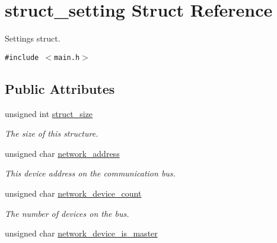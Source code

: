 \hypertarget{structstruct__setting}{
\section{struct\_\-setting Struct Reference}
\label{structstruct__setting}
}
Settings struct.  


{\tt \#include $<$main.h$>$}

\subsection*{Public Attributes}
\begin{CompactItemize}
\item 
\hypertarget{structstruct__setting_f04e2d9d3ccc998c560c2907505be6ca}{
unsigned int \hyperlink{structstruct__setting_f04e2d9d3ccc998c560c2907505be6ca}{struct\_\-size}}
\label{structstruct__setting_f04e2d9d3ccc998c560c2907505be6ca}

\begin{CompactList}\small\item\em The size of this structure. \item\end{CompactList}\item 
\hypertarget{structstruct__setting_d31da2957970eb0e3d4b8b29220f4312}{
unsigned char \hyperlink{structstruct__setting_d31da2957970eb0e3d4b8b29220f4312}{network\_\-address}}
\label{structstruct__setting_d31da2957970eb0e3d4b8b29220f4312}

\begin{CompactList}\small\item\em This device address on the communication bus. \item\end{CompactList}\item 
\hypertarget{structstruct__setting_b1788192fdd675e45577525f4a66f6ed}{
unsigned char \hyperlink{structstruct__setting_b1788192fdd675e45577525f4a66f6ed}{network\_\-device\_\-count}}
\label{structstruct__setting_b1788192fdd675e45577525f4a66f6ed}

\begin{CompactList}\small\item\em The number of devices on the bus. \item\end{CompactList}\item 
\hypertarget{structstruct__setting_2a79f1a7d4b0469bc2d2d8aef3480bd7}{
unsigned char \hyperlink{structstruct__setting_2a79f1a7d4b0469bc2d2d8aef3480bd7}{network\_\-device\_\-is\_\-master}}
\label{structstruct__setting_2a79f1a7d4b0469bc2d2d8aef3480bd7}


\end{CompactItemize}
